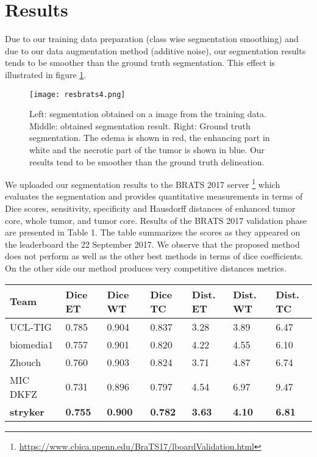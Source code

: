 \documentclass[11pt]{article}
\begin{document}
\section{Results}

Due to our training data preparation (class wise segmentation smoothing) and due to our data augmentation method (additive noise), our segmentation results tends to be smoother than the ground truth segmentation. This effect is illustrated in figure \ref{train}.\\

\begin{figure}[httb]
    \centering
    \texttt{[image: resbrats4.png]}
    \caption{Left: segmentation obtained on a image from the training data. Middle: obtained segmentation result. Right: Ground truth segmentation. The edema is shown in red, the enhancing part in white and the necrotic part of the tumor is shown in blue. Our results tend to be smoother than the ground truth delineation. }
    \label{train}
\end{figure}

We uploaded our segmentation results to the BRATS 2017 server \footnote{\url{https://www.cbica.upenn.edu/BraTS17/lboardValidation.html} } which evaluates the segmentation and provides quantitative measurements in terms of Dice scores, sensitivity, specificity and Hausdorff distances of enhanced tumor core, whole tumor, and tumor core. Results of the BRATS 2017 validation phase are presented in Table 1. The table summarizes the scores as they appeared on the leaderboard the 22 September 2017. We observe that the proposed method does not perform as well as the other best methods in terms of dice coefficients. On the other side our method produces very competitive distances metrics.\\

\begin{center}
  \begin{tabular}{ | l | l | l | l | l | l | l | }
    \hline
    Team & Dice ET & Dice WT & Dice TC & Dist. ET & Dist. WT & Dist. TC \\ \hline
    UCL-TIG   & 0.785 & 0.904 & 0.837 & 3.28 & 3.89 & 6.47 \\ \hline
    biomedia1 & 0.757 & 0.901 & 0.820 & 4.22 & 4.55 & 6.10 \\ \hline
    Zhouch    & 0.760 & 0.903 & 0.824 & 3.71 & 4.87 & 6.74 \\ \hline
    MIC DKFZ  & 0.731 & 0.896 & 0.797 & 4.54 & 6.97 & 9.47 \\ \hline
    \textbf{stryker}  & \textbf{0.755} & \textbf{0.900} & \textbf{0.782} & \textbf{3.63} & \textbf{4.10} & \textbf{6.81} \\
    \hline
  \end{tabular}
\end{center}
\end{document}

